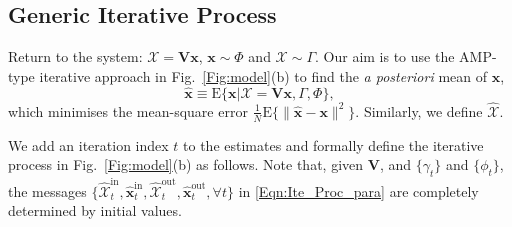 \documentclass[journal]{IEEEtran}
\newcommand{\mr}{\mathrm}
\newcommand{\BE}{\begin{equation}}
\newcommand{\EE}{\end{equation}}
\renewcommand{\bf}{\bm}
\newtheorem{lemma}[theorem]{Lemma}
\begin{document}


\subsection{Generic Iterative Process}\label{Sec:GIP_ER}  
Return to the system: $\bf{\mathcal{X}} = \bf{V x}$, $\bf{x}\sim\Phi$ and $\bf{\mathcal{X}}\sim\Gamma$.  Our aim is to use the AMP-type iterative approach in Fig.~\ref{Fig:model}(b) to find the \textit{a posteriori} mean of $\bf{x}$,
\BE\label{Eqn:post_mean}
\hat{\bf{x}} \equiv {\mr{E}}\{\bf{x}|\bf{\mathcal{X}}=\bf{V}\bf{x}, {\Gamma}, {\Phi} \},
\EE
which minimises the mean-square error $ \tfrac{1}{N}{\mr{E}}\big\{\|\hat{\bf{x}}-{\bf{x}}\|^2\big\}$. Similarly, we define ${\bf{\mathcal{\hat{X}}}}$. 

We add an iteration index $t$ to the estimates and formally define the iterative process in Fig.~\ref{Fig:model}(b) as follows. Note that, given $\bf{V}$, and $\{\gamma_t\}$ and $\{\phi_t\}$, the messages $\{\bf{\mathcal{\hat{X}}}^{\mr{in}}_t, \hat{\bf{x}}_t^{\mr{in}}, \bf{\mathcal{\hat{X}}}_t^{\mr{out}}, \hat{\bf{x}}_t^{\mr{out}}, \forall t\}$ in \eqref{Eqn:Ite_Proc_para} are completely determined by initial values.  %
\end{document}
